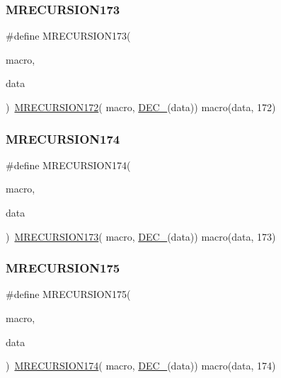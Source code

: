 \subsubsection{\texorpdfstring{MRECURSION173}{MRECURSION173}}
{\footnotesize\ttfamily \#define M\+R\+E\+C\+U\+R\+S\+I\+O\+N173(\begin{DoxyParamCaption}\item[{}]{macro,  }\item[{}]{data }\end{DoxyParamCaption})~\mbox{\hyperlink{group__group__sam0__utils__mrecursion_ga85f7c1151cdfbbf54a6fe28fc21c5615}{M\+R\+E\+C\+U\+R\+S\+I\+O\+N172}}(  macro, \mbox{\hyperlink{group__group__sam0__utils__mrecursion_ga1d23d683797679dca8c3512a54a5dcae}{D\+E\+C\+\_\+}}(data))   macro(data, 172)}

\mbox{\label{group__group__sam0__utils__mrecursion_ga6023acb2866bab1aaa0f09c9bc0859f1}} 
\subsubsection{\texorpdfstring{MRECURSION174}{MRECURSION174}}
{\footnotesize\ttfamily \#define M\+R\+E\+C\+U\+R\+S\+I\+O\+N174(\begin{DoxyParamCaption}\item[{}]{macro,  }\item[{}]{data }\end{DoxyParamCaption})~\mbox{\hyperlink{group__group__sam0__utils__mrecursion_ga783792df27d635d1463e416e45bf890e}{M\+R\+E\+C\+U\+R\+S\+I\+O\+N173}}(  macro, \mbox{\hyperlink{group__group__sam0__utils__mrecursion_ga1d23d683797679dca8c3512a54a5dcae}{D\+E\+C\+\_\+}}(data))   macro(data, 173)}

\mbox{\label{group__group__sam0__utils__mrecursion_ga5cf6e0c15dc63f70fd0bea450a714a61}} 
\subsubsection{\texorpdfstring{MRECURSION175}{MRECURSION175}}
{\footnotesize\ttfamily \#define M\+R\+E\+C\+U\+R\+S\+I\+O\+N175(\begin{DoxyParamCaption}\item[{}]{macro,  }\item[{}]{data }\end{DoxyParamCaption})~\mbox{\hyperlink{group__group__sam0__utils__mrecursion_ga6023acb2866bab1aaa0f09c9bc0859f1}{M\+R\+E\+C\+U\+R\+S\+I\+O\+N174}}(  macro, \mbox{\hyperlink{group__group__sam0__utils__mrecursion_ga1d23d683797679dca8c3512a54a5dcae}{D\+E\+C\+\_\+}}(data))   macro(data, 174)}

